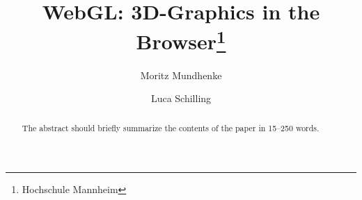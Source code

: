 \documentclass[runningheads]{llncs}
\begin{document}
%
\title{WebGL: 3D-Graphics in the Browser\thanks{Hochschule Mannheim}}
%
%
\author{Moritz Mundhenke \and
Luca Schilling}
%
%
%
\maketitle              %
%


\begin{abstract}
The abstract should briefly summarize the contents of the paper in
15--250 words.

\end{abstract}
%
%
%









{}

\end{document}
